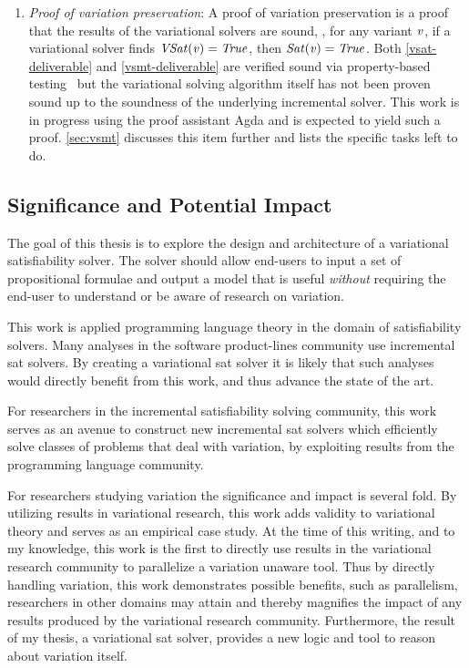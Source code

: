 \begin{enumerate}
\item \label{proof-deliverable} \textit{Proof of variation preservation}: A
  proof of variation preservation is a proof that the results of the variational
  solvers are sound, \ie{}, for any variant $\mathit{v}$, if a variational solver
  finds $\mathit{VSat(v)} = \mathit{True}$, then $\mathit{Sat(v)} = \mathit{True}$. Both
  \autoref{vsat-deliverable} and \autoref{vsmt-deliverable} are verified sound
  via property-based testing~\cite{10.1145/351240.351266} but the variational
  solving algorithm itself has not been proven sound up to the soundness of the
  underlying incremental solver. This work is in progress using the proof
  assistant Agda\cite{10.1145/2841316} and is expected to yield such a proof.
  \autoref{sec:vsmt} discusses this item further and lists the specific tasks
  left to do.
\end{enumerate}

\subsection{Significance and Potential Impact}%
\label{sec:sign-potent-impact}
The goal of this thesis is to explore the design and architecture of a
variational satisfiability solver. The solver should allow end-users to input a
set of propositional formulae and output a model that is useful \emph{without}
requiring the end-user to understand or be aware of research on variation.

This work is applied programming language theory in the domain of satisfiability
solvers. Many analyses in the software product-lines community use incremental
\ac{sat} solvers. By creating a variational \ac{sat} solver it is likely that
such analyses would directly benefit from this work, and thus advance the state
of the art.

For researchers in the incremental satisfiability solving community, this work
serves as an avenue to construct new incremental \ac{sat} solvers which
efficiently solve classes of problems that deal with variation, by exploiting
results from the programming language community.

For researchers studying variation the significance and impact is several fold.
By utilizing results in variational research, this work adds validity to
variational theory and serves as an empirical case study. At the time of this
writing, and to my knowledge, this work is the first to directly use results in
the variational research community to parallelize a variation unaware tool. Thus
by directly handling variation, this work demonstrates possible benefits, such
as parallelism, researchers in other domains may attain and thereby magnifies
the impact of any results produced by the variational research community.
Furthermore, the result of my thesis, a variational \ac{sat} solver, provides a
new logic and tool to reason about variation itself.

